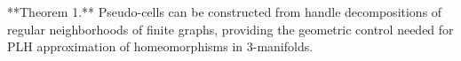 **Theorem 1.** Pseudo-cells can be constructed from handle decompositions of regular neighborhoods of finite graphs, providing the geometric control needed for PLH approximation of homeomorphisms in 3-manifolds.
